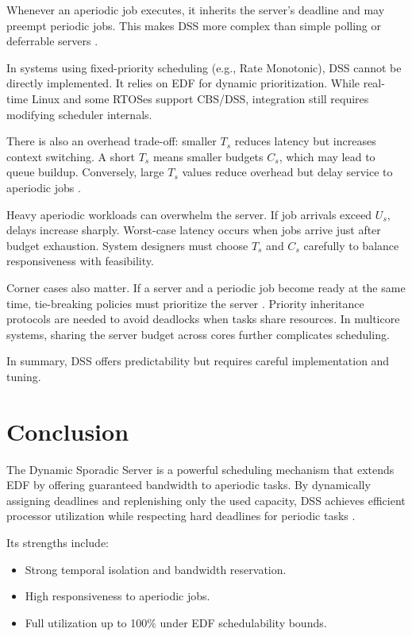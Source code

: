 \documentclass[conference]{IEEEtran}
\begin{document}
Whenever an aperiodic job executes, it inherits the server’s deadline and may preempt periodic jobs. This makes DSS more complex than simple polling or deferrable servers \cite{cpen432, queensu2023dss}.

In systems using fixed-priority scheduling (e.g., Rate Monotonic), DSS cannot be directly implemented. It relies on EDF for dynamic prioritization. While real-time Linux and some RTOSes support CBS/DSS, integration still requires modifying scheduler internals.

There is also an overhead trade-off: smaller $T_s$ reduces latency but increases context switching. A short $T_s$ means smaller budgets $C_s$, which may lead to queue buildup. Conversely, large $T_s$ values reduce overhead but delay service to aperiodic jobs \cite{queensu2023dss}.

Heavy aperiodic workloads can overwhelm the server. If job arrivals exceed $U_s$, delays increase sharply. Worst-case latency occurs when jobs arrive just after budget exhaustion. System designers must choose $T_s$ and $C_s$ carefully to balance responsiveness with feasibility.

Corner cases also matter. If a server and a periodic job become ready at the same time, tie-breaking policies must prioritize the server \cite{cpen432}. Priority inheritance protocols are needed to avoid deadlocks when tasks share resources. In multicore systems, sharing the server budget across cores further complicates scheduling.

In summary, DSS offers predictability but requires careful implementation and tuning.

\vspace{1em}
\section{Conclusion}

The Dynamic Sporadic Server is a powerful scheduling mechanism that extends EDF by offering guaranteed bandwidth to aperiodic tasks. By dynamically assigning deadlines and replenishing only the used capacity, DSS achieves efficient processor utilization while respecting hard deadlines for periodic tasks \cite{spuri1994efficient, buttazzo2011hard}.

Its strengths include:
\begin{itemize}
    \item Strong temporal isolation and bandwidth reservation.
    \item High responsiveness to aperiodic jobs.
    \item Full utilization up to 100\% under EDF schedulability bounds.
\end{itemize}
\end{document}
